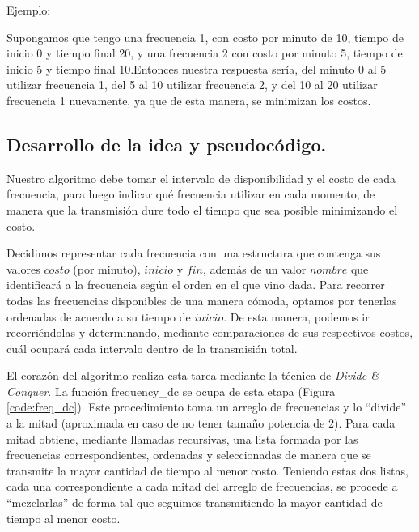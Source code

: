 Ejemplo:

Supongamos que tengo una frecuencia 1, con costo por minuto de 10, tiempo de inicio 0 y tiempo final 20, y una frecuencia 2 con costo por minuto 5, tiempo de inicio 5 y tiempo final 10.Entonces nuestra respuesta sería, del minuto 0 al 5 utilizar frecuencia 1, del 5 al 10 utilizar frecuencia 2, y del 10 al 20 utilizar frecuencia 1 nuevamente, ya que de esta manera, se minimizan los costos.



\vspace*{0.6cm}

\subsection{Desarrollo de la idea y pseudocódigo.}

\vspace*{0.3cm}

Nuestro algoritmo debe tomar el intervalo de disponibilidad y el costo de cada frecuencia, para luego indicar qué frecuencia utilizar en cada momento, de manera que la transmisión dure todo el tiempo que sea posible minimizando el costo.

Decidimos representar cada frecuencia con una estructura que contenga sus valores $costo$ (por minuto), $inicio$ y $fin$, además de un valor $nombre$ que identificará a la frecuencia según el orden en el que vino dada.  Para recorrer todas las frecuencias disponibles de una manera cómoda, optamos por tenerlas ordenadas de acuerdo  a su tiempo de $inicio$.  De esta manera, podemos ir recorriéndolas y determinando, mediante comparaciones de sus respectivos costos, cuál ocupará cada intervalo dentro de la transmisión total.

El corazón del algoritmo realiza esta tarea mediante la técnica de {\it Divide \& Conquer}.  La función {\sc frequency_dc} se ocupa de esta etapa (Figura \ref{code:freq_dc}).  Este procedimiento toma un arreglo de frecuencias y lo ``divide'' a la mitad (aproximada en caso de no tener tamaño potencia de 2).  Para cada mitad obtiene, mediante llamadas recursivas, una lista formada por las frecuencias correspondientes, ordenadas y seleccionadas de manera que se transmite la mayor cantidad de tiempo al menor costo.  Teniendo estas dos listas, cada una correspondiente a cada mitad del arreglo de frecuencias, se procede a ``mezclarlas'' de forma tal que seguimos transmitiendo la mayor cantidad de tiempo al menor costo.

